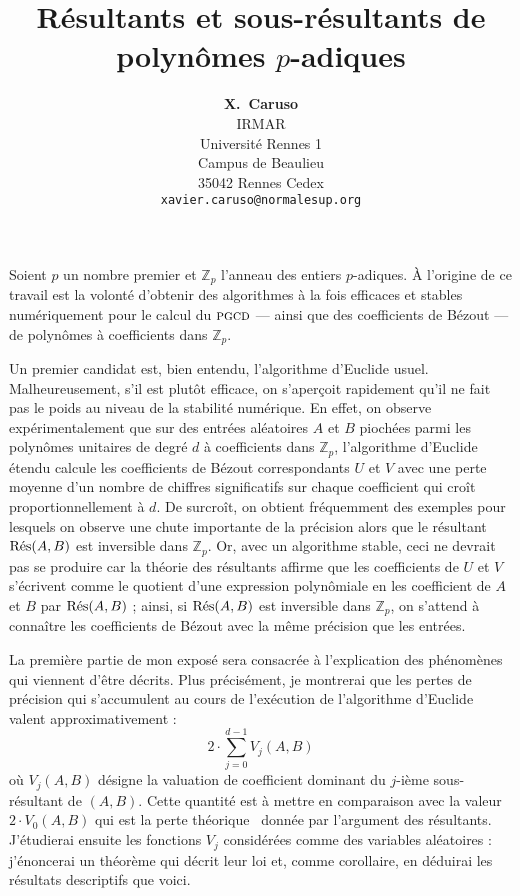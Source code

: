 \documentclass[12pt,a4paper]{article}
\newcommand{\Z}{\mathbb Z}
\newcommand{\pgcd}{\text{\sc pgcd}}
\newcommand{\Res}{\text{\rm Rés}}
\begin{document}
\thispagestyle{empty}  

\title{\textbf{Résultants et sous-résultants de polynômes $p$-adiques}}

\author{\textbf{X.~Caruso} \\
IRMAR \\
Université Rennes 1 \\
Campus de Beaulieu \\
35042 Rennes Cedex \\
\texttt{xavier.caruso@normalesup.org}}
\date{}

\maketitle

Soient $p$ un nombre premier et $\Z_p$ l'anneau des entiers 
$p$-adiques. À l'origine de ce travail est la volonté d'obtenir
des algorithmes à la fois efficaces et stables numériquement pour
le calcul du $\pgcd$ --- ainsi que des coefficients de Bézout ---
de polynômes à coefficients dans $\Z_p$.

\medskip

Un premier candidat est, bien entendu, l'algorithme d'Euclide usuel. 
Malheureusement, s'il est plutôt efficace, on s'aperçoit rapidement 
qu'il ne fait pas le poids au niveau de la stabilité numérique. En 
effet, on observe expérimentalement que sur des entrées aléatoires $A$ 
et $B$ piochées parmi les polynômes unitaires de degré $d$ à 
coefficients dans $\Z_p$, l'algorithme d'Euclide étendu calcule les 
coefficients de Bézout correspondants $U$ et $V$ avec une perte moyenne 
d'un nombre de chiffres significatifs sur chaque coefficient qui croît 
proportionnellement à $d$.
De surcroît, on obtient fréquemment des exemples pour lesquels on 
observe une chute importante de la précision alors que le résultant 
$\Res(A,B)$ est inversible dans $\Z_p$. Or, avec un algorithme stable,
ceci ne devrait pas se produire car la théorie des résultants affirme 
que les coefficients de $U$ et $V$ s'écrivent comme le quotient d'une 
expression polynômiale en les coefficient de $A$ et $B$ par $\Res(A,B)$ ; 
ainsi, si $\Res(A,B)$ est inversible dans $\Z_p$, on s'attend à 
connaître les coefficients de Bézout avec la même précision que les 
entrées.

\bigskip

La première partie de mon exposé sera consacrée à l'explication des 
phénomènes qui viennent d'être décrits. Plus précisément, je 
montrerai que les pertes de précision qui s'accumulent au cours de 
l'exécution de l'algorithme d'Euclide valent approximativement :
\begin{equation}
\label{eq:perteEuclide}
2 \cdot \sum_{j=0}^{d-1} V_j(A,B)
\end{equation}
où $V_j(A,B)$ désigne la valuation de coefficient dominant du $j$-ième
sous-résultant de $(A,B)$.
Cette quantité est à mettre en comparaison avec la valeur $2 \cdot 
V_0(A,B)$ qui est la perte \og théorique \fg\ donnée par l'argument
des résultants. J'étudierai ensuite les fonctions $V_j$ considérées 
comme des variables aléatoires : j'énoncerai un théorème qui décrit 
leur loi et, comme corollaire, en déduirai les résultats descriptifs 
que voici.
\end{document}
